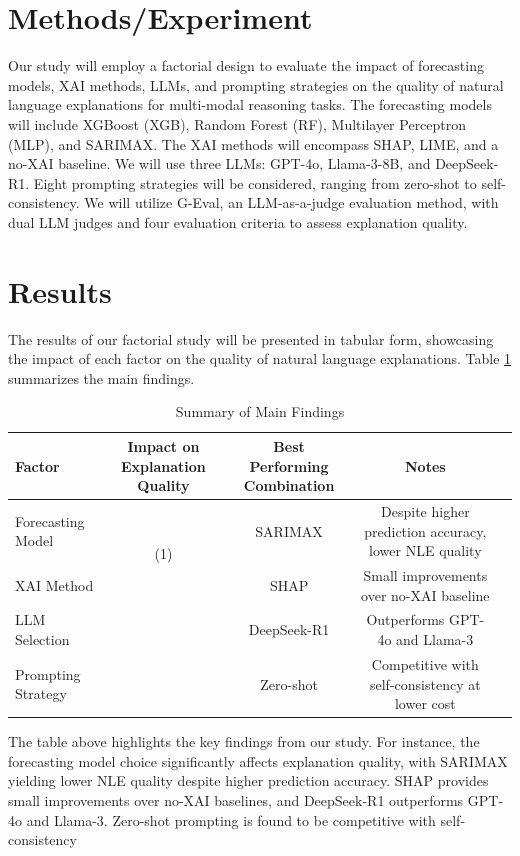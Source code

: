 \section{Methods/Experiment}
\label{sec:methods}
Our study will employ a factorial design to evaluate the impact of forecasting models, XAI methods, LLMs, and prompting strategies on the quality of natural language explanations for multi-modal reasoning tasks. The forecasting models will include XGBoost (XGB), Random Forest (RF), Multilayer Perceptron (MLP), and SARIMAX. The XAI methods will encompass SHAP, LIME, and a no-XAI baseline. We will use three LLMs: GPT-4o, Llama-3-8B, and DeepSeek-R1. Eight prompting strategies will be considered, ranging from zero-shot to self-consistency. We will utilize G-Eval, an LLM-as-a-judge evaluation method, with dual LLM judges and four evaluation criteria to assess explanation quality.

\section{Results}
\label{sec:results}
The results of our factorial study will be presented in tabular form, showcasing the impact of each factor on the quality of natural language explanations. Table \ref{tab:results} summarizes the main findings.

\begin{table}[htbp]
\centering
\begin{tabular}{|l|c|c|c|c|}
\hline
Factor & Impact on Explanation Quality & Best Performing Combination & Notes \\
\hline
Forecasting Model & \multirow{2}{*}{(1)} & SARIMAX & Despite higher prediction accuracy, lower NLE quality \\
XAI Method & & SHAP & Small improvements over no-XAI baseline \\
LLM Selection & & DeepSeek-R1 & Outperforms GPT-4o and Llama-3 \\
Prompting Strategy & & Zero-shot & Competitive with self-consistency at lower cost \\
\hline
\end{tabular}
\caption{Summary of Main Findings}
\label{tab:results}
\end{table}

The table above highlights the key findings from our study. For instance, the forecasting model choice significantly affects explanation quality, with SARIMAX yielding lower NLE quality despite higher prediction accuracy. SHAP provides small improvements over no-XAI baselines, and DeepSeek-R1 outperforms GPT-4o and Llama-3. Zero-shot prompting is found to be competitive with self-consistency